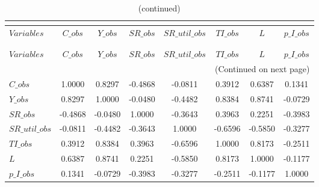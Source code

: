  
\begin{center}
\begin{longtable}{lccccccc} 
\caption{MATRIX OF CORRELATIONS}\\
 \label{Table:th_corr_matrix}\\
\toprule 
$Variables      $	 & 	 $          C\_obs$	 & 	 $          Y\_obs$	 & 	 $         SR\_obs$	 & 	 $  SR\_util\_obs$	 & 	 $         TI\_obs$	 & 	 $                L$	 & 	 $      p\_I\_obs$\\
\midrule \endfirsthead 
\caption{(continued)}\\
 \toprule \\ 
$Variables      $	 & 	 $          C\_obs$	 & 	 $          Y\_obs$	 & 	 $         SR\_obs$	 & 	 $  SR\_util\_obs$	 & 	 $         TI\_obs$	 & 	 $                L$	 & 	 $      p\_I\_obs$\\
\midrule \endhead 
\midrule \multicolumn{8}{r}{(Continued on next page)} \\ \bottomrule \endfoot 
\bottomrule \endlastfoot 
$C\_obs         $	 & 	           1.0000	 & 	           0.8297	 & 	          -0.4868	 & 	          -0.0811	 & 	           0.3912	 & 	           0.6387	 & 	           0.1341 \\ 
$Y\_obs         $	 & 	           0.8297	 & 	           1.0000	 & 	          -0.0480	 & 	          -0.4482	 & 	           0.8384	 & 	           0.8741	 & 	          -0.0729 \\ 
$SR\_obs        $	 & 	          -0.4868	 & 	          -0.0480	 & 	           1.0000	 & 	          -0.3643	 & 	           0.3963	 & 	           0.2251	 & 	          -0.3983 \\ 
$SR\_util\_obs  $	 & 	          -0.0811	 & 	          -0.4482	 & 	          -0.3643	 & 	           1.0000	 & 	          -0.6596	 & 	          -0.5850	 & 	          -0.3277 \\ 
$TI\_obs        $	 & 	           0.3912	 & 	           0.8384	 & 	           0.3963	 & 	          -0.6596	 & 	           1.0000	 & 	           0.8173	 & 	          -0.2511 \\ 
$L              $	 & 	           0.6387	 & 	           0.8741	 & 	           0.2251	 & 	          -0.5850	 & 	           0.8173	 & 	           1.0000	 & 	          -0.1177 \\ 
$p\_I\_obs      $	 & 	           0.1341	 & 	          -0.0729	 & 	          -0.3983	 & 	          -0.3277	 & 	          -0.2511	 & 	          -0.1177	 & 	           1.0000 \\ 
\end{longtable}
 \end{center}
